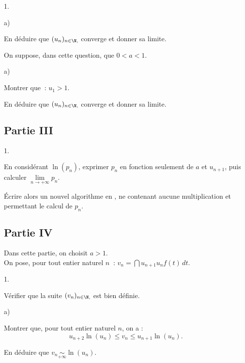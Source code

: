 \documentclass[11pt]{article}%
\begin{document}
\begin{noliste}{1.}
\begin{noliste}{a)}
\item En déduire que $(u_{n})_{n\in \N,}$ converge et donner sa
limite.
\end{noliste}

\item On suppose, dans cette question, que $0<a<1$.

\begin{noliste}{a)}
 \setlength{\itemsep}{2mm}
\item Montrer que$\ $ : $u_{1}>1$.

\item En déduire que $(u_{n})_{n\in \N,}$ converge et donner sa
limite.
\end{noliste}
\end{noliste}

\subsection*{Partie III}

\begin{noliste}{1.}
 \setlength{\itemsep}{4mm}
\item En considérant $\ln (p_{n})$, exprimer $p_{n}$ en fonction
seulement
de $a$ et $u_{n + 1}$, puis calculer $\underset{{n\rightarrow + \infty
}}{{\lim 
}}p_{n}$.

\item Écrire alors un nouvel algorithme en \Scilab{}, ne contenant
aucune
multiplication et permettant le calcul de $p_{n}$.
\end{noliste}

\subsection*{Partie IV}

Dans cette partie, on choisit $a>1$.\\
On pose, pour tout entier naturel $n\ $ : $v_{n} = {\dint{u_{n +
1}}{u_{n}}{f(t)\,dt}}$.

\begin{noliste}{1.}
 \setlength{\itemsep}{4mm}
\item Vérifier que la suite $(v_{n})_{n\in \N,}$ est bien définie.

\item 

\begin{noliste}{a)}
 \setlength{\itemsep}{2mm}
\item Montrer que, pour tout entier naturel $n$, on a : 
\[
u_{n + 2}\ln (u_{n})\leq v_{n}\leq u_{n + 1}\ln (u_{n}).
\]

\item En déduire que $v_{n}\underset{{+ \infty }}{{\sim }}\ln (u_{n})$.
\end{noliste}
\end{noliste}

\label{fin}
\end{document}
